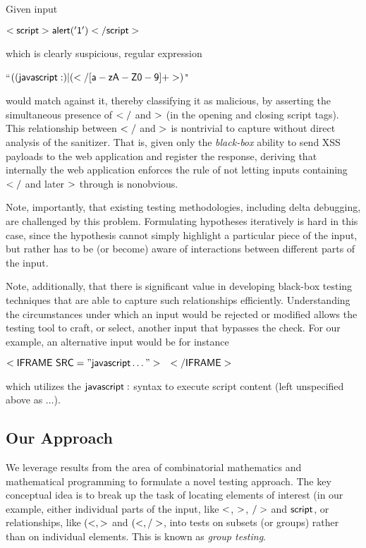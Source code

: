 Given input 
\begin{center}
$\sf{<script>alert('1')</script>}$
\end{center}
which is clearly suspicious, regular expression
\begin{center}
``$\sf{((javascript:)|(</[a-zA-Z0-9]+>)}$"
\end{center}
would match against it, thereby classifying it as malicious, by asserting the simultaneous presence of ${\sf </}$ and ${\sf >}$ (in the opening and closing {\sf script} tags). This relationship between ${\sf </}$ and ${\sf >}$ is nontrivial to capture without direct analysis of the sanitizer. That is, given only the \emph{black-box} ability to send XSS payloads to the web application and register the response, deriving that internally the web application enforces the rule of not letting inputs containing ${\sf </}$ and later ${\sf >}$ through is nonobvious.

Note, importantly, that existing testing methodologies, including delta debugging, are challenged by this problem. Formulating hypotheses iteratively is hard in this case, since the hypothesis cannot simply highlight a particular piece of the input, but rather has to be (or become) aware of interactions between different parts of the input.

Note, additionally, that there is significant value in developing black-box testing techniques that are able to capture such relationships efficiently. Understanding the circumstances under which an input would be rejected or modified allows the testing tool to craft, or select, another input that bypasses the check. For our example, an alternative input would be for instance
\begin{center}
	${\sf <IFRAME~SRC="javascript\ldots">\quad\sf </IFRAME>}$
	\end{center}
which utilizes the ${\sf javascript:}$ syntax to execute script content (left unspecified above as $\ldots$).

\subsection{Our Approach} We leverage results from the area of combinatorial mathematics and mathematical programming to formulate a novel testing approach. The key conceptual idea is to break up the task of locating elements of interest (in our example, either individual parts of the input, like ${\sf <}$,
${\sf >}$, ${\sf />}$ and ${\sf script}$, or relationships, like ${\sf (<,>}$ and ${\sf (<,/>}$, into tests on subsets (or groups) rather than on individual elements. This is known as \emph{group testing}.

